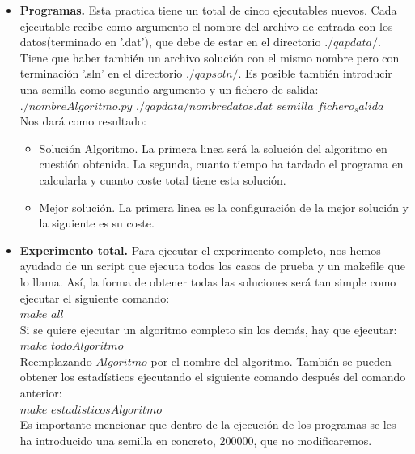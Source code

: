 \begin{itemize}
	\item \textbf{Programas.} Esta practica tiene un total de cinco ejecutables nuevos. Cada ejecutable recibe como argumento el nombre del archivo de entrada con los datos(terminado en '.dat'), que debe de estar en el directorio $./qapdata/$. Tiene que haber también un archivo solución con el mismo nombre pero con terminación '.sln'  en el directorio $./qapsoln/$. Es posible también introducir una semilla como segundo argumento y un fichero de salida:\\
	
	$./nombreAlgoritmo.py$ $./qapdata/nombredatos.dat$ $semilla$ $fichero_salida$\\
	
	Nos dará como resultado:\\
	\begin{itemize}
		\item Solución Algoritmo. La primera linea será la solución del algoritmo en cuestión obtenida. La segunda, cuanto tiempo ha tardado el programa en calcularla y cuanto coste total tiene esta solución.
		\item Mejor solución. La primera linea es la configuración de la mejor solución y la siguiente es su coste.
	\end{itemize}
	
	\item \textbf{Experimento total.} Para ejecutar el experimento completo, nos hemos ayudado de un script que ejecuta todos los casos de prueba y un makefile que lo llama. Así, la forma de obtener todas las soluciones será tan simple como ejecutar el siguiente comando:\\
	
	$make$ $all$\\
	
	Si se quiere ejecutar un algoritmo completo sin los demás, hay que ejecutar:\\
	
	$make$ $todoAlgoritmo$\\
	
	Reemplazando $Algoritmo$ por el nombre del algoritmo. También se pueden obtener los estadísticos ejecutando el siguiente comando después del comando anterior:\\
	
	$make$ $estadisticosAlgoritmo$\\
	
	
	Es importante mencionar que dentro de la ejecución de los programas se les ha introducido una semilla en concreto, $200000$, que no modificaremos.\\
	
	
\end{itemize}

